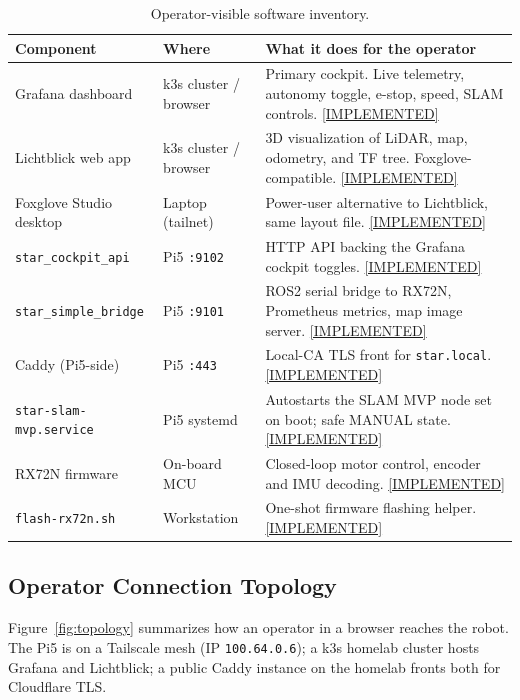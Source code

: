 \documentclass[11pt,letterpaper]{article}
\newcommand{\statuslabel}[1]{\hyperref[sec:status-legend]{[#1]}}
\begin{document}
\begin{table}[H]
\centering
\caption{Operator-visible software inventory.}
\label{tab:inventory}
\small
\begin{tabularx}{\linewidth}{l l X}
\toprule
\textbf{Component} & \textbf{Where} & \textbf{What it does for the operator} \\
\midrule
Grafana dashboard       & k3s cluster / browser
    & Primary cockpit. Live telemetry, autonomy toggle, e-stop,
      speed, SLAM controls. \statuslabel{IMPLEMENTED} \\
Lichtblick web app      & k3s cluster / browser
    & 3D visualization of LiDAR, map, odometry, and TF tree.
      Foxglove-compatible. \statuslabel{IMPLEMENTED} \\
Foxglove Studio desktop & Laptop (tailnet)
    & Power-user alternative to Lichtblick, same layout file.
      \statuslabel{IMPLEMENTED} \\
\texttt{star\_cockpit\_api} & Pi5 \texttt{:9102}
    & HTTP API backing the Grafana cockpit toggles.
      \statuslabel{IMPLEMENTED} \\
\texttt{star\_simple\_bridge} & Pi5 \texttt{:9101}
    & ROS2 serial bridge to RX72N, Prometheus metrics, map image
      server. \statuslabel{IMPLEMENTED} \\
Caddy (Pi5-side)        & Pi5 \texttt{:443}
    & Local-CA TLS front for \texttt{star.local}. \statuslabel{IMPLEMENTED} \\
\texttt{star-slam-mvp.service} & Pi5 systemd
    & Autostarts the SLAM MVP node set on boot; safe MANUAL state.
      \statuslabel{IMPLEMENTED} \\
RX72N firmware          & On-board MCU
    & Closed-loop motor control, encoder and IMU decoding.
      \statuslabel{IMPLEMENTED} \\
\texttt{flash-rx72n.sh}  & Workstation
    & One-shot firmware flashing helper. \statuslabel{IMPLEMENTED} \\
\bottomrule
\end{tabularx}
\end{table}

\subsection{Operator Connection Topology}
Figure~\ref{fig:topology} summarizes how an operator in a browser
reaches the robot. The Pi5 is on a Tailscale mesh (IP
\texttt{100.64.0.6}); a k3s homelab cluster hosts Grafana and
Lichtblick; a public Caddy instance on the homelab fronts both for
Cloudflare TLS.
\end{document}
